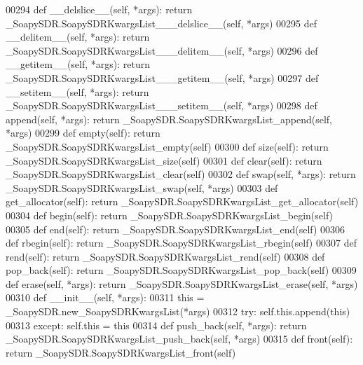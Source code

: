 \begin{DoxyCode}
{{{{00294     \textcolor{keyword}{def }__delslice__(self, *args): \textcolor{keywordflow}{return} \_SoapySDR.SoapySDRKwargsList\_\_\_delslice\_\_(self, *args)
00295     \textcolor{keyword}{def }__delitem__(self, *args): \textcolor{keywordflow}{return} \_SoapySDR.SoapySDRKwargsList\_\_\_delitem\_\_(self, *args)
00296     \textcolor{keyword}{def }__getitem__(self, *args): \textcolor{keywordflow}{return} \_SoapySDR.SoapySDRKwargsList\_\_\_getitem\_\_(self, *args)
00297     \textcolor{keyword}{def }__setitem__(self, *args): \textcolor{keywordflow}{return} \_SoapySDR.SoapySDRKwargsList\_\_\_setitem\_\_(self, *args)
00298     \textcolor{keyword}{def }append(self, *args): \textcolor{keywordflow}{return} \_SoapySDR.SoapySDRKwargsList\_append(self, *args)
00299     \textcolor{keyword}{def }empty(self): \textcolor{keywordflow}{return} \_SoapySDR.SoapySDRKwargsList\_empty(self)
00300     \textcolor{keyword}{def }size(self): \textcolor{keywordflow}{return} \_SoapySDR.SoapySDRKwargsList\_size(self)
00301     \textcolor{keyword}{def }clear(self): \textcolor{keywordflow}{return} \_SoapySDR.SoapySDRKwargsList_clear(self)
00302     \textcolor{keyword}{def }swap(self, *args): \textcolor{keywordflow}{return} \_SoapySDR.SoapySDRKwargsList\_swap(self, *args)
00303     \textcolor{keyword}{def }get_allocator(self): \textcolor{keywordflow}{return} \_SoapySDR.SoapySDRKwargsList\_get\_allocator(self)
00304     \textcolor{keyword}{def }begin(self): \textcolor{keywordflow}{return} \_SoapySDR.SoapySDRKwargsList\_begin(self)
00305     \textcolor{keyword}{def }end(self): \textcolor{keywordflow}{return} \_SoapySDR.SoapySDRKwargsList\_end(self)
00306     \textcolor{keyword}{def }rbegin(self): \textcolor{keywordflow}{return} \_SoapySDR.SoapySDRKwargsList\_rbegin(self)
00307     \textcolor{keyword}{def }rend(self): \textcolor{keywordflow}{return} \_SoapySDR.SoapySDRKwargsList\_rend(self)
00308     \textcolor{keyword}{def }pop_back(self): \textcolor{keywordflow}{return} \_SoapySDR.SoapySDRKwargsList\_pop\_back(self)
00309     \textcolor{keyword}{def }erase(self, *args): \textcolor{keywordflow}{return} \_SoapySDR.SoapySDRKwargsList\_erase(self, *args)
00310     \textcolor{keyword}{def }__init__(self, *args): 
00311         this = \_SoapySDR.new\_SoapySDRKwargsList(*args)
00312         \textcolor{keywordflow}{try}: self.this.append(this)
00313         \textcolor{keywordflow}{except}: self.this = this
00314     \textcolor{keyword}{def }push_back(self, *args): \textcolor{keywordflow}{return} \_SoapySDR.SoapySDRKwargsList\_push\_back(self, *args)
00315     \textcolor{keyword}{def }front(self): \textcolor{keywordflow}{return} \_SoapySDR.SoapySDRKwargsList\_front(self)
}}}}
\end{DoxyCode}
